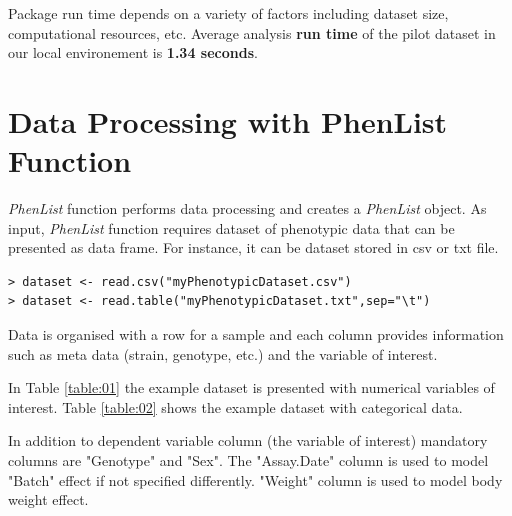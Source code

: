 \documentclass[12pt,a4paper]{article}
\begin{document}
Package run time depends on a variety of factors including dataset size, computational resources, etc. Average analysis \textbf{run time} of the pilot dataset in our local environement is \textbf{1.34 seconds}. 


\section{Data Processing with PhenList Function}
\textit{PhenList} function performs data processing and creates a \textit{PhenList} object. 
As input, \textit{PhenList} function requires dataset of phenotypic data that can be presented as data frame. For instance, it can be dataset stored in csv or txt file. 


\begingroup
    \fontsize{8pt}{12pt}\selectfont
\begin{verbatim}
> dataset <- read.csv("myPhenotypicDataset.csv")
> dataset <- read.table("myPhenotypicDataset.txt",sep="\t")
\end{verbatim}
\endgroup
Data is organised with a row for a sample and each column provides information such as meta data (strain, genotype, etc.) and the variable of interest.

In Table \ref{table:01} the example dataset is presented with numerical variables of interest. Table \ref{table:02} shows the example dataset with categorical data. 

In addition to dependent variable column (the variable of interest) mandatory columns are "Genotype" and "Sex". The "Assay.Date" column is used to model "Batch" effect if not specified differently. "Weight" column is used to model body weight effect.
\end{document}
